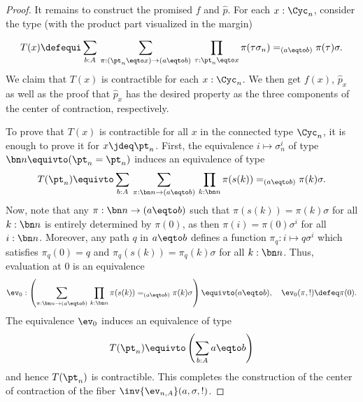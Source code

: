 \begin{proof}
  It remains to construct the promised $f$ and $\hat p$.
  For each $x:\Cyc_n$, consider the type (with the product
  part visualized in the margin)
  \begin{marginfigure}
\end{marginfigure}
  \begin{displaymath}
    T(x) \defequi \sum_{b:A}\,\sum_{\pi: (\pt_n \eqto x) \to (a \eqto b)}\,
    \prod_{\tau: \pt_n \eqto x} \pi(\tau\sigma_n) =_{(a\eqto b)} \pi(\tau) \sigma.
  \end{displaymath}
  We claim that $T(x)$ is contractible for each $x:\Cyc_n$.
  We then get $f(x)$, $\hat p_x$ as well as the proof that
  $\hat p_x$ has the desired property as the three components
  of the center of contraction, respectively.

  To prove that $T(x)$ is contractible for all $x$
  in the connected type $\Cyc_n$, it is enough to prove it for
  $x \jdeq \pt_n$. First, the equivalence $i \mapsto \sigma_n^i$
  of type $\bn n \equivto (\pt_n = \pt_n)$ induces an equivalence of type
  \begin{displaymath}
    T(\pt_n) \equivto \sum_{b:A}\,\sum_{\pi: \bn n \to (a \eqto b)}\,
    \prod_{k:\bn n} \pi(s(k)) =_{(a\eqto b)} \pi(k)\sigma.
  \end{displaymath}
  Now, note that any $\pi:\bn n \to (a\eqto b)$ such that
  $\pi(s(k)) = \pi(k) \sigma$ for all $k:\bn n$ is entirely determined
  by $\pi(0)$, as then $\pi(i) = \pi(0)\sigma^i$ for all $i:\bn n$.
  Moreover, any path $q$ in $a\eqto b$ defines a function
  $\pi_q:i \mapsto q\sigma^i$ which satisfies $\pi_q(0) = q$ and
  $\pi_q(s(k)) = \pi_q(k) \sigma$ for all $k:\bn n$.
  Thus, evaluation at $0$ is an equivalence
  \begin{displaymath}
    \ev_0 : \left( \sum_{\pi:\bn n \to (a\eqto b)}\,
    \prod_{k:\bn n} \pi(s(k)) =_{(a\eqto b)} \pi(k)\sigma \right)
    \equivto (a \eqto b), \quad
    \ev_0(\pi, !) \defeq \pi(0).
  \end{displaymath}
  The equivalence $\ev_0$ induces an equivalence of type
  \begin{displaymath}
    T(\pt_n) \equivto \left(\sum_{b:A} a \eqto b\right)
  \end{displaymath}
  and hence $T(\pt_n)$ is contractible. This completes the construction
  of the center of contraction of the fiber $\inv{\ev_{n,A}}(a,\sigma,!)$.


\end{proof}
